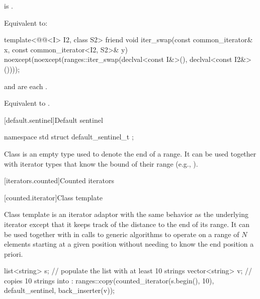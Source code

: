\begin{itemdescr}
\pnum
\expects
{} is .

\pnum
\effects
Equivalent to: 
\end{itemdescr}

%
\begin{itemdecl}
template<@@<I> I2, class S2>
  friend void iter_swap(const common_iterator& x, const common_iterator<I2, S2>& y)
    noexcept(noexcept(ranges::iter_swap(declval<const I&>(), declval<const I2&>())));
\end{itemdecl}

\begin{itemdescr}
\pnum
\expects
{} and 
are each .

\pnum
\effects
Equivalent to .
\end{itemdescr}

[default.sentinel]{Default sentinel}

%
\begin{itemdecl}
namespace std {
  struct default_sentinel_t { };
}
\end{itemdecl}

\pnum
Class  is an empty type used to denote the end of a
range. It can be used together with iterator types that know the bound
of their range (e.g., ).

[iterators.counted]{Counted iterators}

[counted.iterator]{Class template }

\pnum
Class template  is an iterator adaptor
with the same behavior as the underlying iterator except that
it keeps track of the distance to the end of its range.
It can be used together with 
in calls to generic algorithms to operate on
a range of $N$ elements starting at a given position
without needing to know the end position a priori.

\pnum
\begin{example}
\begin{codeblock}
list<string> s;
// populate the list  with at least 10 strings
vector<string> v;
// copies 10 strings into :
ranges::copy(counted_iterator(s.begin(), 10), default_sentinel, back_inserter(v));
\end{codeblock}
\end{example}

